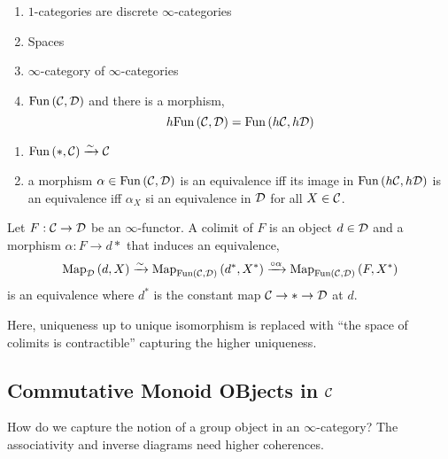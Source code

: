 \documentclass[12pt]{article}
\begin{document}
\begin{example}
\begin{enumerate}
\item $1$-categories are discrete $\infty$-categories
\item Spaces
\item $\infty$-category of $\infty$-categories
\item $\mathrm{Fun}\left( \mathcal{C}, \mathcal{D} \right)$ and there is a morphism,
\[ h \mathrm{Fun}\left( \mathcal{C}, \mathcal{D} \right) = \mathrm{Fun}\left( h \mathcal{C}, h \mathcal{D} \right) \]
\end{enumerate}
\end{example}

\begin{prop}
\begin{enumerate}
\item $\mathrm{Fun}\left( *, \mathcal{C} \right) \xrightarrow{\sim} \mathcal{C}$
\item a morphism $\alpha \in \mathrm{Fun}\left( \mathcal{C}, \mathcal{D} \right)$ is an equivalence iff its image in $\mathrm{Fun}\left( h \mathcal{C}, h \mathcal{D} \right)$ is an equivalence iff $\alpha_X$ si an equivalence in $\mathcal{D}$ for all $X \in \mathcal{C}$. 
\end{enumerate}
\end{prop}

\begin{defn}
Let $F : \mathcal{C} \to \mathcal{D}$ be an $\infty$-functor. A colimit of $F$ is an object $d \in \mathcal{D}$ and a morphism $\alpha : F \to d*$ that induces an equivalence,
\[ \mathrm{Map}_{\mathcal{D}}\left(d, X \right) \xrightarrow{\sim} \mathrm{Map}_{\mathrm{Fun}\left( \mathcal{C}, \mathcal{D} \right)}\left(d^*, X^* \right) \xrightarrow{ \circ \alpha} \mathrm{Map}_{\mathrm{Fun}\left( \mathcal{C}, \mathcal{D} \right)}\left(F, X^* \right) \]
is an equivalence where $d^*$ is the constant map $\mathcal{C} \to * \to \mathcal{D}$ at $d$. 
\end{defn}

\begin{rmk}
Here, uniqueness up to unique isomorphism is replaced with ``the space of colimits is contractible'' capturing the higher uniqueness. 
\end{rmk}

\subsection{Commutative Monoid OBjects in $\mathcal{C}$}

How do we capture the notion of a group object in an $\infty$-category? The associativity and inverse diagrams need higher coherences.

\newcommand{\CMon}[1]{\mathrm{CMon}\left( #1 \right)}
\newcommand{\Fin}{\mathrm{Fin}}
\newcommand{\ul}[1]{\underline{#1}}
\newcommand{\Space}{\mathbf{Space}}
\newcommand{\Set}{\mathbf{Set}}
\newcommand{\gp}{\mathrm{gp}}
\end{document}
